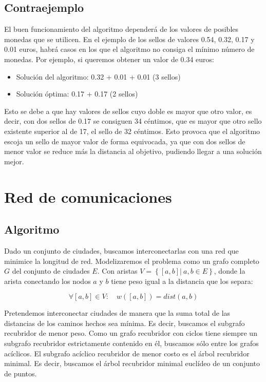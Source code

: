 \documentclass[a4paper, 11pt]{article} %
\begin{document}
\subsection{Contraejemplo}
El buen funcionamiento del algoritmo dependerá de los valores de posibles monedas que se utilicen. En el ejemplo de los sellos de valores 0.54, 0.32, 0.17 y 0.01 euros,
habrá casos en los que el algoritmo no consiga el mínimo número de monedas. Por ejemplo, si queremos obtener un valor de 0.34 euros:
\begin{itemize}
	\item Solución del algoritmo: 0.32 + 0.01 + 0.01 (3 sellos)
	\item Solución óptima: 0.17 + 0.17 (2 sellos)
\end{itemize}

Esto se debe a que hay valores de sellos cuyo doble es mayor que otro valor, es decir, con dos sellos de 0.17 se consiguen 34 céntimos, que es mayor que otro sello existente superior al de 17, el sello de 32 céntimos. Esto provoca que el algoritmo escoja un sello de mayor valor de forma equivocada, ya que con dos sellos de menor valor se reduce más la distancia al objetivo, pudiendo llegar a una solución mejor.
  
\section{Red de comunicaciones}
  \subsection{Algoritmo}
    Dado un conjunto de ciudades, buscamos interconectarlas con una red que minimice la longitud de red. 
    Modelizaremos el problema como un grafo completo $G$ del conjunto de ciudades $E$. Con aristas 
    $V = \left\{ [a,b] |\ a,b \in E \right\}$, donde la arista conectando los nodos $a$ y $b$ tiene peso 
    igual a la distancia que los separa:

    \begin{equation}
     \forall [a,b]\in V:\quad  w([a,b]) = dist (a,b)
    \end{equation}

    Pretendemos interconectar ciudades de manera que la suma total de las distancias de los caminos hechos 
    sea mínima. Es decir, buscamos el subgrafo recubridor de menor peso. Como un grafo recubridor con ciclos 
    tiene siempre un subgrafo recubridor estrictamente contenido en él, buscamos sólo entre los grafos acíclicos.
    El subgrafo acíclico recubridor de menor costo es el árbol recubridor minimal. Es decir, buscamos el árbol
    recubridor minimal euclídeo de un conjunto de puntos.
    
\end{document}
